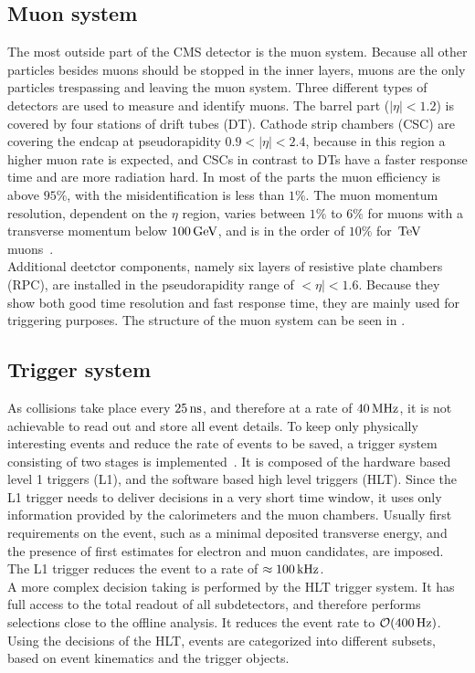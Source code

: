 \subsection{Muon system}
The most outside part of the CMS detector is the muon system. Because all other particles besides muons should be stopped in the inner layers, muons are the only particles trespassing and leaving the muon system. Three different types of detectors are used to measure and identify muons. The barrel part ($|\eta|<1.2$) is covered by four stations of drift tubes (DT). Cathode strip chambers (CSC) are covering the endcap at pseudorapidity $0.9<|\eta|<2.4$, because in this region a higher muon rate is expected, and CSCs in contrast to DTs have a faster response time and are more radiation hard. In most of the parts the muon efficiency is above $95\%$, with the misidentification is less than $1\%$. The muon momentum resolution, dependent on the $\eta$ region, varies between $1\%$ to $6\%$ for muons with a transverse momentum below $100\,\text{Ge\hspace{-.08em}V}$, and is in the order of $10\%$ for $\,\text{Te\hspace{-.08em}V}$ muons~\cite{MuonPerformance}.\\
Additional deetctor components, namely six layers of resistive plate chambers (RPC), are installed in the pseudorapidity range of $<\eta|<1.6$. Because they show both good time resolution and fast response time, they are mainly used for triggering purposes. The structure of the muon system can be seen in .

\subsection{Trigger system}
As collisions take place every $25\,\text{ns}$, and therefore at a rate of $40\,\text{MHz}$, it is not achievable to read out and store all event details. To keep only physically interesting events and reduce the rate of events to be saved, a trigger system consisting of two stages is implemented~\cite{TriggerSystem}. It is composed of the hardware based level 1 triggers (L1), and the software based high level triggers (HLT). Since the L1 trigger needs to deliver decisions in a very short time window, it uses only information provided by the calorimeters and the muon chambers. Usually first requirements on the event, such as a minimal deposited transverse energy, and  the presence of first estimates for electron and muon candidates, are imposed. The L1 trigger reduces the event to a rate of $\approx100\,\text{kHz}$.\\
A more complex decision taking is performed by the HLT trigger system. It has full access to the total readout of all subdetectors, and therefore performs selections close to the offline analysis. It reduces the event rate to $\mathcal{O}(400\,\text{Hz})$.\\
Using the decisions of the HLT, events are categorized into different subsets, based on event kinematics and the trigger objects.
